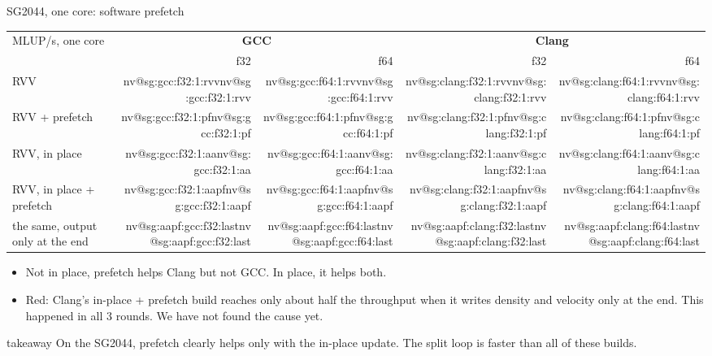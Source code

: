 \documentclass[aspectratio=169,10pt,t]{beamer}
\makeatletter
\newcommand{\nv}[1]{\ifcsname nv@#1\endcsname\csname nv@#1\endcsname\else
  \errmessage{presentation7: unknown number '#1' (see tables/numbers.tex)}\fi}
\newcommand{\takeaway}[1]{\par\vfill
  \begin{beamercolorbox}[wd=\textwidth,sep=4pt,rounded=true]{takeaway}
    \small #1
  \end{beamercolorbox}}
\makeatother
\begin{document}
\begin{frame}{SG2044, one core: software prefetch}
  \vspace{1mm}
  \centering
  {\footnotesize\renewcommand{\arraystretch}{1.12}
  \begin{tabular}{@{}lrrrr@{}}
    \toprule
    MLUP/s, one core & \multicolumn{2}{c}{\textbf{GCC}} & \multicolumn{2}{c}{\textbf{Clang}}\\
    \cmidrule(lr){2-3}\cmidrule(l){4-5}
    & f32 & f64 & f32 & f64\\
    \midrule
    RVV & \nv{sg:gcc:f32:1:rvv} & \nv{sg:gcc:f64:1:rvv} & \nv{sg:clang:f32:1:rvv} & \nv{sg:clang:f64:1:rvv}\\
    RVV + prefetch & \nv{sg:gcc:f32:1:pf} & \nv{sg:gcc:f64:1:pf} & \nv{sg:clang:f32:1:pf} & \nv{sg:clang:f64:1:pf}\\
    \midrule
    RVV, in place & \nv{sg:gcc:f32:1:aa} & \nv{sg:gcc:f64:1:aa} & \nv{sg:clang:f32:1:aa} & \nv{sg:clang:f64:1:aa}\\
    RVV, in place + prefetch & \nv{sg:gcc:f32:1:aapf} & \nv{sg:gcc:f64:1:aapf} & \nv{sg:clang:f32:1:aapf} & \nv{sg:clang:f64:1:aapf}\\
    \hspace{1em}the same, output only at the end & \nv{sg:aapf:gcc:f32:last} & \nv{sg:aapf:gcc:f64:last}
      & \textcolor{psred}{\nv{sg:aapf:clang:f32:last}} & \textcolor{psred}{\nv{sg:aapf:clang:f64:last}}\\
    \bottomrule
  \end{tabular}\par}
  \vspace{2mm}
  \raggedright
  \begin{itemize}\small
    \item Not in place, prefetch helps Clang but not GCC. In place, it helps both.
    \item \textcolor{psred}{Red}: Clang's in-place + prefetch build reaches only about half the throughput when it writes density
          and velocity only at the end. This happened in all 3 rounds. We have not found the cause yet.
  \end{itemize}
  \takeaway{On the SG2044, prefetch clearly helps only with the in-place update. The split loop is faster than all
    of these builds.}
\end{frame}
\end{document}
